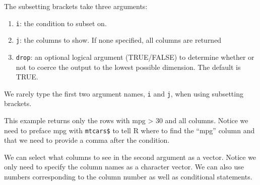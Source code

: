 \documentclass[
]{book}
\newenvironment{Shaded}{\begin{snugshade}}{\end{snugshade}}
\newcommand{\DecValTok}[1]{\textcolor[rgb]{0.00,0.00,0.81}{#1}}
\newcommand{\FloatTok}[1]{\textcolor[rgb]{0.00,0.00,0.81}{#1}}
\newcommand{\NormalTok}[1]{#1}
\newcommand{\SpecialCharTok}[1]{\textcolor[rgb]{0.00,0.00,0.00}{#1}}
\providecommand{\tightlist}{%
  \setlength{\itemsep}{0pt}\setlength{\parskip}{0pt}}
\begin{document}
The subsetting brackets take three arguments:

\begin{enumerate}
\def\labelenumi{\arabic{enumi}.}
\tightlist
\item
  \texttt{i}: the condition to subset on.
\item
  \texttt{j}: the columns to show. If none specified, all columns are returned
\item
  \texttt{drop}: an optional logical argument (TRUE/FALSE) to determine whether or not to coerce the output to the lowest possible dimension. The default is TRUE.
\end{enumerate}

We rarely type the first two argument names, \texttt{i} and \texttt{j}, when using subsetting brackets.

This example returns only the rows with mpg \textgreater{} 30 and all columns. Notice we need to preface mpg with \texttt{mtcars\$} to tell R where to find the ``mpg'' column and that we need to provide a comma after the condition.

\begin{Shaded}
\end{Shaded}

We can select what columns to see in the second argument as a vector. Notice we only need to specify the column names as a character vector. We can also use numbers corresponding to the column number as well as conditional statements.
\end{document}
